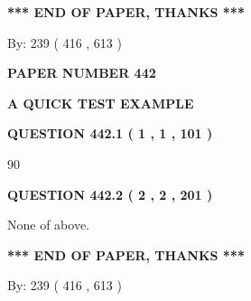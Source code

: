 \documentclass[12pt]{article}
\begin{document}
\vspace{1.0in} 
{\textbf{\large{ *** END OF PAPER, THANKS *** }}} 
   
   
\hspace{1.0in} By: 
 239 ( 416 ,  613 )
   
   
   
   
\newpage 
\setcounter{page}{ 
   442001 } 
   
   
   
   
 {\textbf{ \Large{ PAPER NUMBER  442  }}}
   
   
\vspace{0.2in}
   
   
   
   
   
   
 \vspace{0.2in}
{\LARGE {\textbf{ A QUICK TEST EXAMPLE}}}
   
   
  
\vspace{0.2in}
  
{\textbf{\Large{QUESTION
442.1 
 ( 1 , 1 , 101 )
}}}
  
  
 
 
\noindent{}

90
 
 
  
\vspace{0.2in}
  
{\textbf{\Large{QUESTION
442.2 
 ( 2 , 2 , 201 )
}}}
  
  
 
 
\noindent{}
 
 
 None of above.
 
 
 
 
   
   
 \vspace{0.2in}
 
   
   
   
   
\vspace{1.0in} 
{\textbf{\large{ *** END OF PAPER, THANKS *** }}} 
   
   
\hspace{1.0in} By: 
 239 ( 416 ,  613 )
   
   
   
\end{document}
